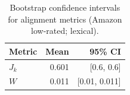 \begin{table}[t]
\centering
\small
\caption{Bootstrap confidence intervals for alignment metrics (Amazon low-rated; lexical).}
\label{tab:bootstrap-ci}
\begin{tabular}{lrr}
\toprule
Metric & Mean & 95\% CI \\
\midrule
$J_k$ & 0.601 & [0.6, 0.6] \\
$W$ & 0.011 & [0.01, 0.011] \\
\bottomrule
\end{tabular}
\end{table}
